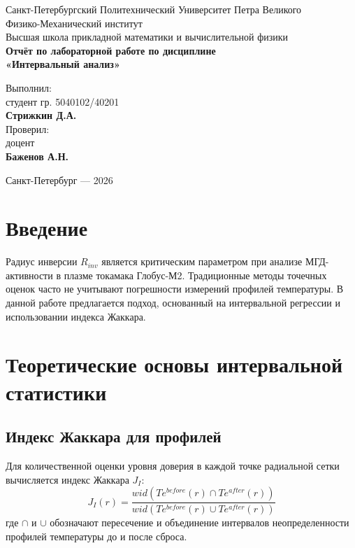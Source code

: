 \documentclass[12pt,a4paper]{article}
\begin{document}
\begin{titlepage}
    \centering
    Санкт-Петербургский Политехнический Университет Петра Великого\\
    Физико-Механический институт\\
    Высшая школа прикладной математики и вычислительной физики\\
    \vfill
    \textbf{Отчёт по лабораторной работе по дисциплине}\\
    \textbf{«Интервальный анализ»}\\
    \vfill
    \begin{flushright}
        Выполнил:\\
        студент гр. 5040102/40201\\
        \textbf{Стрижкин Д.А.}\\
        \vspace{1cm}
        Проверил:\\
        доцент\\
        \textbf{Баженов А.Н.}
    \end{flushright}
    \vfill
    Санкт-Петербург --- 2026
\end{titlepage}

\newpage
\section{Введение}
Радиус инверсии $R_{inv}$ является критическим параметром при анализе МГД-активности в плазме токамака Глобус-М2. Традиционные методы точечных оценок часто не учитывают погрешности измерений профилей температуры. В данной работе предлагается подход, основанный на интервальной регрессии и использовании индекса Жаккара.

\section{Теоретические основы интервальной статистики}
\subsection{Индекс Жаккара для профилей}
Для количественной оценки уровня доверия в каждой точке радиальной сетки вычисляется индекс Жаккара $J_I$:
\begin{equation}
    J_I(r) = \frac{wid(Te^{before}(r) \cap Te^{after}(r))}{wid(Te^{before}(r) \cup Te^{after}(r))}
\end{equation}
где $\cap$ и $\cup$ обозначают пересечение и объединение интервалов неопределенности профилей температуры до и после сброса.
\end{document}
